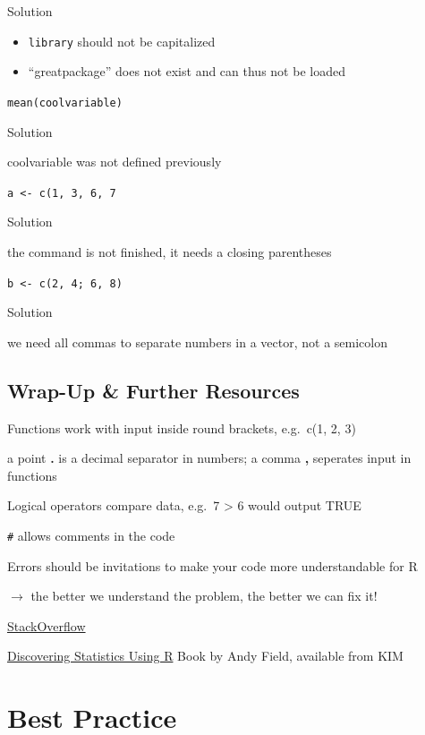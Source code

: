 \documentclass[
]{book}
\providecommand{\tightlist}{%
  \setlength{\itemsep}{0pt}\setlength{\parskip}{0pt}}
\begin{document}
Solution

\begin{itemize}
\tightlist
\item
  \texttt{library} should not be capitalized
\item
  ``greatpackage'' does not exist and can thus not be loaded
\end{itemize}

\texttt{mean(coolvariable)}

Solution

coolvariable was not defined previously

\texttt{a\ \textless{}-\ c(1,\ 3,\ 6,\ 7}

Solution

the command is not finished, it needs a closing parentheses

\texttt{b\ \textless{}-\ c(2,\ 4;\ 6,\ 8)}

Solution

we need all commas to separate numbers in a vector, not a semicolon

\section*{Wrap-Up \& Further Resources}\label{wrap-up-further-resources-1}

Functions work with input inside round brackets, e.g.~c(1, 2, 3)

a point \textbf{.} is a decimal separator in numbers; a comma \textbf{,} seperates input in functions

Logical operators compare data, e.g.~7 \textgreater{} 6 would output TRUE

\texttt{\#} allows comments in the code

Errors should be invitations to make your code more understandable for R

\(\rightarrow\) the better we understand the problem, the better we can fix it!

\href{https://stackoverflow.com/}{StackOverflow}

\href{https://katalog.uni-konstanz.de/libero/WebOpac.cls?VERSION=2&ACTION=DISPLAY&RSN=2222774&DATA=KON&TOKEN=nGIfSiZsIA5826&Z=1&SET=1}{Discovering Statistics Using R} Book by Andy Field, available from KIM

\chapter{Best Practice}\label{best-practice}
\end{document}
